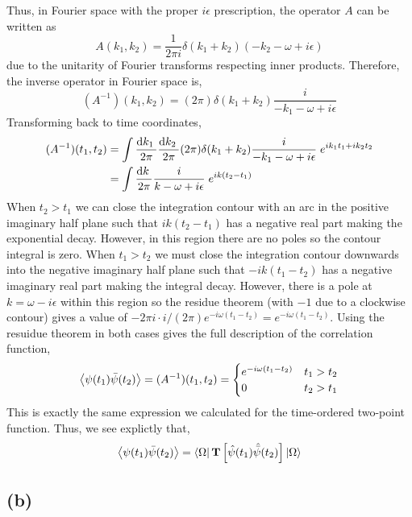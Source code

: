 \documentclass[12pt]{article}
\begin{document}
Thus, in Fourier space with the proper $i \epsilon$ prescription, the operator $A$ can be written as
\[ 
A(k_1, k_2) = \frac{1}{2 \pi i} \delta(k_1 + k_2) (-k_2 - \omega + i \epsilon) 
\]
due to the unitarity of Fourier transforms respecting inner products. 
Therefore, the inverse operator in Fourier space is,
\[ (A^{-1})(k_1, k_2) = (2 \pi) \delta(k_1 + k_2) \frac{i}{-k_1 - \omega + i \epsilon} \]
Transforming back to time coordinates,
\begin{align*}
(A^{-1})(t_1, t_2) & = \int \frac{\mathrm{d}k_1 \:}{2 \pi} \frac{\mathrm{d}k_2 \:}{2 \pi}  (2 \pi) \delta(k_1 + k_2) \frac{i}{-k_1 - \omega + i \epsilon}\; e^{i k_1 t_1 + i k_2 t_2}
\\
& = \int \frac{\mathrm{d}k \:}{2 \pi} \frac{i}{k - \omega + i \epsilon}\; e^{i k(t_2 - t_1)} 
\end{align*} 
When $t_2 > t_1$ we can close the integration contour with an arc in the positive imaginary half plane such that $i k (t_2 - t_1)$ has a negative real part making the exponential decay. However, in this region there are no poles so the contour integral is zero. When $t_1 > t_2$ we must close the integration contour downwards into the negative imaginary half plane such that $-i k (t_1 - t_2)$ has a negative imaginary real part making the integral decay. However, there is a pole at $k = \omega - i \epsilon$ within this region so the residue theorem (with $-1$ due to a clockwise contour) gives a value of $- 2 \pi i \cdot i / (2 \pi) e^{- i \omega (t_1 - t_2) } = e^{ - i \omega (t_1 - t_2) }$. 
Using the resuidue theorem in both cases gives the full description of the correlation function,
\[ \left< \psi(t_1) \bar{\psi}(t_2)  \right> = (A^{-1})(t_1, t_2) = 
\begin{cases}
e^{-i \omega (t_1 - t_2)} & t_1 > t_2 
\\
0 & t_2 > t_1 
\end{cases} \]    
This is exactly the same expression we calculated for the time-ordered two-point function. Thus, we see explictly that,
\[ \left< \psi(t_1) \bar{\psi}(t_2)  \right> = \left< \Omega \right| \mathbf{T}\left[  \hat{\psi}(t_1) \hat{\bar{\psi}}(t_2)  \right] \left| \Omega \right> \]

\subsection{(b)}
\end{document}
